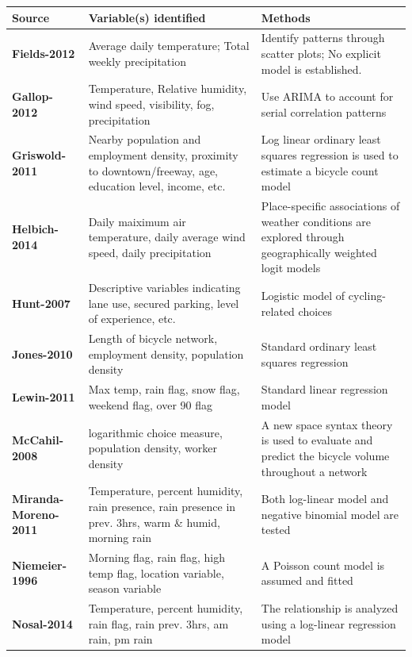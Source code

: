 \documentclass [11pt, proquest] {uwthesis}[2015/03/03]
\begin{document}
\begin{center}
\begin{scriptsize}
 \begin{tabular}{p{3cm} p{7cm} p{5cm}} 
 \hline
 Source & Variable(s) identified & Methods \\ [0.5ex] 
 \hline\hline
\textbf{Fields-2012} & Average daily temperature; Total weekly precipitation & Identify patterns through scatter plots; No explicit model is established. \\
  \textbf{Gallop-2012} & Temperature, Relative humidity, wind speed, visibility, fog, precipitation & Use ARIMA to account for serial correlation patterns \\
  \textbf{Griswold-2011} & Nearby population and employment density, proximity to downtown/freeway, age, education level, income, etc. & Log linear ordinary least squares regression is used to estimate a bicycle count model \\
  \textbf{Helbich-2014} & Daily maiximum air temperature, daily average wind speed, daily precipitation & Place-specific associations of weather conditions are explored through geographically weighted logit models \\
  \textbf{Hunt-2007} & Descriptive variables indicating lane use, secured parking, level of experience, etc. & Logistic model of cycling-related choices \\
  \textbf{Jones-2010} & Length of bicycle network, employment density, population density & Standard ordinary least squares regression \\
  \textbf{Lewin-2011} & Max temp, rain flag, snow flag, weekend flag, over 90 flag & Standard linear regression model \\
  \textbf{McCahil-2008} & logarithmic choice measure, population density, worker density & A new space syntax theory is used to evaluate and predict the bicycle volume throughout a network \\
  \textbf{Miranda-Moreno-2011} & Temperature, percent humidity, rain presence, rain presence in prev. 3hrs, warm \& humid, morning rain & Both log-linear model and negative binomial model are tested \\
  \textbf{Niemeier-1996} & Morning flag, rain flag, high temp flag, location variable, season variable & A Poisson count model is assumed and fitted \\
  \textbf{Nosal-2014} & Temperature, percent humidity, rain flag, rain prev. 3hrs, am rain, pm rain & The relationship is analyzed using a log-linear regression model \\

\end{tabular}
\end{scriptsize}
\end{center}
\end{document}
